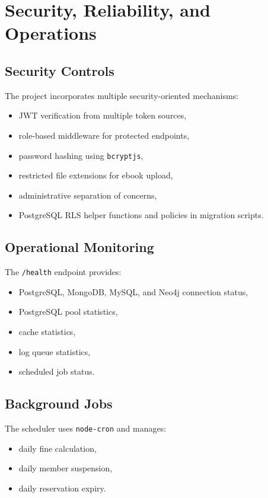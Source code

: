 \documentclass[12pt,a4paper]{report}
\begin{document}
\chapter{Security, Reliability, and Operations}
\section{Security Controls}
The project incorporates multiple security-oriented mechanisms:
\begin{itemize}[leftmargin=1.5em]
    \item JWT verification from multiple token sources,
    \item role-based middleware for protected endpoints,
    \item password hashing using \texttt{bcryptjs},
    \item restricted file extensions for ebook upload,
    \item administrative separation of concerns,
    \item PostgreSQL RLS helper functions and policies in migration scripts.
\end{itemize}

\section{Operational Monitoring}
The \texttt{/health} endpoint provides:
\begin{itemize}[leftmargin=1.5em]
    \item PostgreSQL, MongoDB, MySQL, and Neo4j connection status,
    \item PostgreSQL pool statistics,
    \item cache statistics,
    \item log queue statistics,
    \item scheduled job status.
\end{itemize}

\section{Background Jobs}
The scheduler uses \texttt{node-cron} and manages:
\begin{itemize}[leftmargin=1.5em]
    \item daily fine calculation,
    \item daily member suspension,
    \item daily reservation expiry.
\end{itemize}
\end{document}
